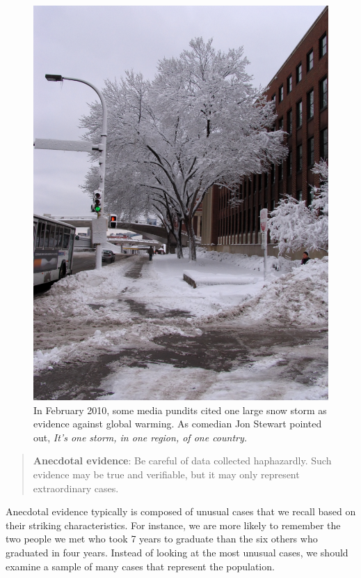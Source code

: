 \documentclass[
  letterpaper,
  DIV=11,
  numbers=noendperiod]{scrreprt}
\begin{document}
\begin{figure}[H]

{\centering \includegraphics{./figures/mnWinter.JPG}

}

\caption{In February 2010, some media pundits cited one large snow storm
as evidence against global warming. As comedian Jon Stewart pointed out,
\emph{It's one storm, in one region, of one country.}}

\end{figure}%

\begin{quote}
\textbf{Anecdotal evidence}: Be careful of data collected haphazardly.
Such evidence may be true and verifiable, but it may only represent
extraordinary cases.
\end{quote}

Anecdotal evidence typically is composed of unusual cases that we recall
based on their striking characteristics. For instance, we are more
likely to remember the two people we met who took 7 years to graduate
than the six others who graduated in four years. Instead of looking at
the most unusual cases, we should examine a sample of many cases that
represent the population.
\end{document}
